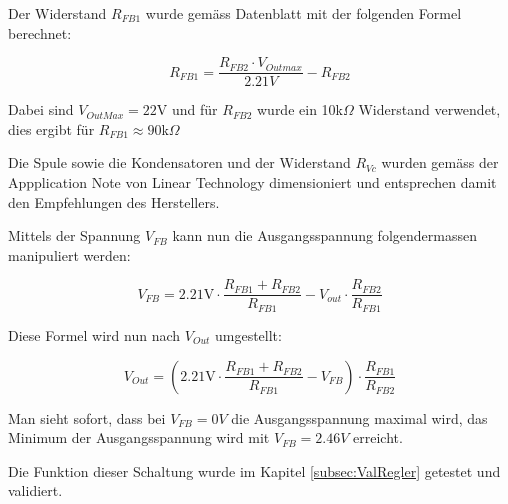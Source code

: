 Der Widerstand $R_{FB1}$ wurde gemäss Datenblatt \cite{LTDatasheet} mit der folgenden Formel berechnet:

\[
R_{FB1}=\frac{R_{FB2}\cdot V_{Outmax}}{2.21V}-R_{FB2}
\]

Dabei sind $V_{OutMax} =22$V und für $R_{FB2}$ wurde ein 10k$\Omega$ Widerstand verwendet, dies ergibt für $R_{FB1} \approx 90$k$\Omega$

Die Spule sowie die Kondensatoren und der Widerstand $R_{Vc}$ wurden gemäss der Appplication Note \cite{LTAppNote} von Linear Technology dimensioniert und entsprechen damit den Empfehlungen des Herstellers.

Mittels der Spannung $V_{FB}$ kann nun die Ausgangsspannung folgendermassen manipuliert werden:

\[
V_{FB}=2.21\text{V}\cdot\frac{R_{FB1}+R_{FB2}}{R_{FB1}}-V_{out}\cdot\frac{R_{FB2}}{R_{FB1}}
\]

Diese Formel wird nun nach $V_{Out}$ umgestellt:

\[
V_{Out} = \left(2.21\text{V}\cdot\frac{R_{FB1}+R_{FB2}}{R_{FB1}} - V_{FB}\right) \cdot\frac{R_{FB1}}{R_{FB2}}
\]

Man sieht sofort, dass bei $V_{FB}=0V$ die Ausgangsspannung maximal wird, das Minimum der Ausgangsspannung wird mit $V_{FB}=2.46V$  erreicht.

Die Funktion dieser Schaltung wurde im Kapitel \ref{subsec:ValRegler} getestet und validiert.

%